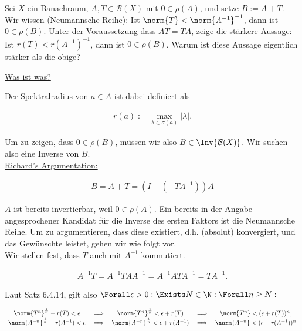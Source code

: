 \begin{exercise}[22/1]

Sei $X$ ein Banachraum, $A, T \in \mathcal{B}(X)$ mit $0 \in \rho(A)$, und setze $B := A + T$.
Wir wissen (Neumannsche Reihe):
Ist $\norm{T} < \norm{A^{-1}}^{-1}$, dann ist $0 \in \rho(B)$.
Unter der Voraussetzung dass $A T = T A$, zeige die stärkere Aussage:
Ist $r(T) < r(A^{-1})^{-1}$, dann ist $0 \in \rho(B)$.
Warum ist diese Aussage eigentlich stärker als die obige?

\end{exercise}

\begin{solution}

\underline{Was ist was?}


Der Spektralradius von $a \in A$ ist dabei definiert als

\begin{align*}
  r(a)
  :=
  \max_{\lambda \in \sigma(a)} |\lambda|.
\end{align*}

Um zu zeigen, dass $0 \in \rho(B)$, müssen wir also $B \in \Inv{\mathcal{B}(X)}$.
Wir suchen also eine Inverse von $B$. \\

\underline{Richard's Argumentation:}

\begin{align*}
  B
  =
  A + T
  =
  (I - (-T A^{-1})) A
\end{align*}

$A$ ist bereits invertierbar, weil $0 \in \rho(A)$.
Ein bereits in der Angabe angesprochener Kandidat für die Inverse des ersten Faktors ist die Neumannsche Reihe.
Um zu argumentieren, dass diese existiert, d.h. (absolut) konvergiert, und das Gewünschte leistet, gehen wir wie folgt vor. \\

Wir stellen fest, dass $T$ auch mit $A^{-1}$ kommutiert.

\begin{align}
    A^{-1} T
    =
    A^{-1} T A A^{-1}
    =
    A^{-1} A T A^{-1}
    = T A^{-1}.
\end{align}


Laut Satz 6.4.14, gilt also $\Forall \epsilon > 0: \Exists N \in \N: \Forall n \geq N:$

\begin{align*}
\begin{array}{ccccc}
  \norm{T^n}^\frac{1}{n} - r(T) < \epsilon &
  \implies &
  \norm{T^n}^\frac{1}{n} < \epsilon + r(T) &
  \implies &
  \norm{T^n} < (\epsilon + r(T))^n, \\
  \norm{A^{-n}}^\frac{1}{n} - r(A^{-1}) < \epsilon &
  \implies &
  \norm{A^{-n}}^\frac{1}{n} < \epsilon + r(A^{-1}) &
  \implies &
  \norm{A^{-n}} < (\epsilon + r(A^{-1}))^n
\end{array}
\end{align*}


\end{solution}
